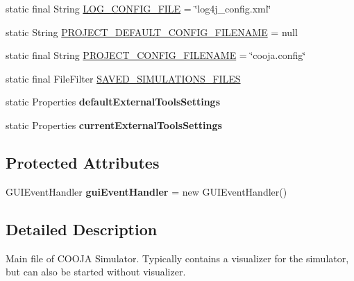 \begin{DoxyCompactItemize}
\item 
static final String \hyperlink{classorg_1_1contikios_1_1cooja_1_1Cooja_a427daf961354f0d5ba97e164895a4092}{L\-O\-G\-\_\-\-C\-O\-N\-F\-I\-G\-\_\-\-F\-I\-L\-E} = \char`\"{}log4j\-\_\-config.\-xml\char`\"{}
\item 
static String \hyperlink{classorg_1_1contikios_1_1cooja_1_1Cooja_aca1341e1789a5cb45b370458d20776a2}{P\-R\-O\-J\-E\-C\-T\-\_\-\-D\-E\-F\-A\-U\-L\-T\-\_\-\-C\-O\-N\-F\-I\-G\-\_\-\-F\-I\-L\-E\-N\-A\-M\-E} = null
\item 
static final String \hyperlink{classorg_1_1contikios_1_1cooja_1_1Cooja_a4cf31aa608d594c6f3318f3a001637c0}{P\-R\-O\-J\-E\-C\-T\-\_\-\-C\-O\-N\-F\-I\-G\-\_\-\-F\-I\-L\-E\-N\-A\-M\-E} = \char`\"{}cooja.\-config\char`\"{}
\item 
static final File\-Filter \hyperlink{classorg_1_1contikios_1_1cooja_1_1Cooja_a378fe78babb39ed68123203dc7ba01f4}{S\-A\-V\-E\-D\-\_\-\-S\-I\-M\-U\-L\-A\-T\-I\-O\-N\-S\-\_\-\-F\-I\-L\-E\-S}
\item 
\hypertarget{classorg_1_1contikios_1_1cooja_1_1Cooja_a2f018b27739bd5c70efceee3fb19dfea}{static Properties {\bfseries default\-External\-Tools\-Settings}}\label{classorg_1_1contikios_1_1cooja_1_1Cooja_a2f018b27739bd5c70efceee3fb19dfea}

\item 
\hypertarget{classorg_1_1contikios_1_1cooja_1_1Cooja_ae3bed99889fdc5d5c65c38f15c6f39fb}{static Properties {\bfseries current\-External\-Tools\-Settings}}\label{classorg_1_1contikios_1_1cooja_1_1Cooja_ae3bed99889fdc5d5c65c38f15c6f39fb}

\end{DoxyCompactItemize}
\subsection*{Protected Attributes}
\begin{DoxyCompactItemize}
\item 
\hypertarget{classorg_1_1contikios_1_1cooja_1_1Cooja_a951f03ffbc57eaf7c8ef13f3191905b9}{G\-U\-I\-Event\-Handler {\bfseries gui\-Event\-Handler} = new G\-U\-I\-Event\-Handler()}\label{classorg_1_1contikios_1_1cooja_1_1Cooja_a951f03ffbc57eaf7c8ef13f3191905b9}

\end{DoxyCompactItemize}


\subsection{Detailed Description}
Main file of C\-O\-O\-J\-A Simulator. Typically contains a visualizer for the simulator, but can also be started without visualizer.

